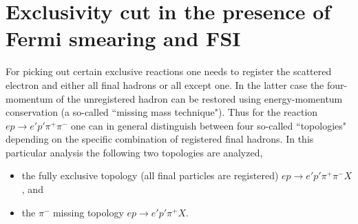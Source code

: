 



\newpage
\section{Exclusivity cut in the presence of Fermi smearing and FSI}
\label{Sect:excl_cut}

For picking out certain exclusive reactions one needs to register the scattered electron and either all final hadrons or all except one. In the latter case the four-momentum of the unregistered hadron can be restored using energy-momentum conservation (a so-called ``missing mass technique"). Thus for the reaction $e p \rightarrow e' p' \pi^{+} \pi^{-} $ one can in general distinguish between four so-called ``topologies" depending on the specific combination of registered final hadrons. In this particular analysis the following two topologies are analyzed,%
\begin{itemize}
\item the fully exclusive topology (all final particles are registered) $e p \rightarrow e' p' \pi^{+} \pi^{-} X$, and%
\item the $\pi^{-}$ missing topology $e p \rightarrow e' p' \pi^{+} X$.
\end{itemize} %


